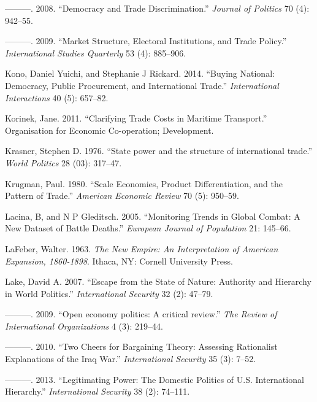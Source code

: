 \documentclass{puthesis}
\newlength{\cslhangindent}
\newenvironment{cslreferences}%
  {\setlength{\parindent}{0pt}%
  \everypar{\setlength{\hangindent}{\cslhangindent}}\ignorespaces}%
  {\par}
\begin{document}
\begin{cslreferences}
\leavevmode\hypertarget{ref-Kono2008}{}%
---------. 2008. ``Democracy and Trade Discrimination.'' \emph{Journal
of Politics} 70 (4): 942--55.

\leavevmode\hypertarget{ref-Kono2009}{}%
---------. 2009. ``Market Structure, Electoral Institutions, and Trade
Policy.'' \emph{International Studies Quarterly} 53 (4): 885--906.

\leavevmode\hypertarget{ref-Kono2014}{}%
Kono, Daniel Yuichi, and Stephanie J Rickard. 2014. ``Buying National:
Democracy, Public Procurement, and International Trade.''
\emph{International Interactions} 40 (5): 657--82.

\leavevmode\hypertarget{ref-Korinek2011}{}%
Korinek, Jane. 2011. ``Clarifying Trade Costs in Maritime Transport.''
Organisation for Economic Co-operation; Development.

\leavevmode\hypertarget{ref-Krasner1976}{}%
Krasner, Stephen D. 1976. ``State power and the structure of
international trade.'' \emph{World Politics} 28 (03): 317--47.

\leavevmode\hypertarget{ref-Krugman1980}{}%
Krugman, Paul. 1980. ``Scale Economies, Product Differentiation, and the
Pattern of Trade.'' \emph{American Economic Review} 70 (5): 950--59.

\leavevmode\hypertarget{ref-Lacina2005}{}%
Lacina, B, and N P Gleditsch. 2005. ``Monitoring Trends in Global
Combat: A New Dataset of Battle Deaths.'' \emph{European Journal of
Population} 21: 145--66.

\leavevmode\hypertarget{ref-LaFeber1963}{}%
LaFeber, Walter. 1963. \emph{The New Empire: An Interpretation of
American Expansion, 1860-1898}. Ithaca, NY: Cornell University Press.

\leavevmode\hypertarget{ref-Lake2007}{}%
Lake, David A. 2007. ``Escape from the State of Nature: Authority and
Hierarchy in World Politics.'' \emph{International Security} 32 (2):
47--79.

\leavevmode\hypertarget{ref-Lake2009b}{}%
---------. 2009. ``Open economy politics: A critical review.'' \emph{The
Review of International Organizations} 4 (3): 219--44.

\leavevmode\hypertarget{ref-Lake2010}{}%
---------. 2010. ``Two Cheers for Bargaining Theory: Assessing
Rationalist Explanations of the Iraq War.'' \emph{International
Security} 35 (3): 7--52.

\leavevmode\hypertarget{ref-Lake2013}{}%
---------. 2013. ``Legitimating Power: The Domestic Politics of U.S.
International Hierarchy.'' \emph{International Security} 38 (2):
74--111.


\end{cslreferences}
\end{document}
